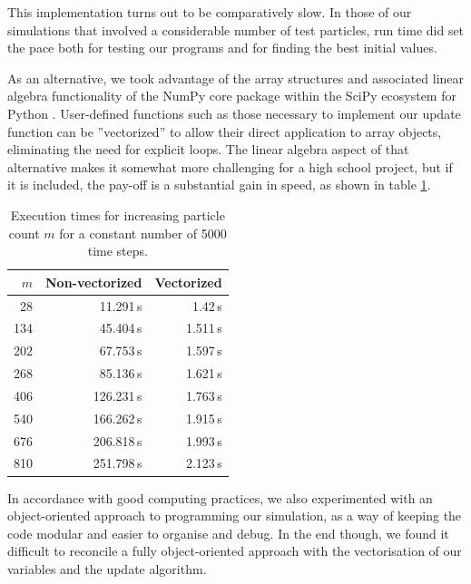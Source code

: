 \documentclass[11pt,twocolumn]{article}
\begin{document}
This implementation turns out to be comparatively slow. In those of our simulations that involved a considerable number of test particles, run time did set the pace both for testing our programs and for finding the best initial values. 

As an alternative, we took advantage of the array structures and associated linear algebra functionality of the NumPy core package within the SciPy ecosystem for Python \cite{SciPyLibrary,NumPy}. User-defined functions such as those necessary to implement our update function can be ''vectorized'' to allow their direct application to array objects, eliminating the need for explicit loops. The linear algebra aspect of that alternative makes it somewhat more challenging for a high school project, but if it is included, the pay-off is a substantial gain in speed, as shown in table \ref{table:extimes}.
            \begin{table}[ht]
            \centering
            \bgroup
            \renewcommand{\arraystretch}{1.2}	
            \begin{tabular}{r | r | r}
            $m$ & Non-vectorized & Vectorized \\ \hline
            28  & 11.291\,s &  1.42\,s \\ 
            134 & 45.404\,s &	 1.511\,s \\
            202 & 67.753\,s &  1.597\,s \\
            268 & 85.136\,s &	 1.621\,s \\
            406 & 126.231\,s & 1.763\,s \\
            540 & 166.262\,s & 1.915\,s \\
            676 & 206.818\,s & 1.993\,s \\
            810 & 251.798\,s & 2.123\,s \\
            \end{tabular}
            \egroup
            \caption{Execution times for increasing particle count $m$ for a constant number of 5000 time steps.
                        \label{table:extimes}}
            \end{table}
In accordance with good computing practices, we also experimented with an object-oriented approach to programming our simulation, as a way of keeping the code modular and easier to organise and debug. In the end though, we found it difficult to reconcile a fully object-oriented approach with the vectorisation of our variables and the update algorithm. 
        
            
\end{document}
